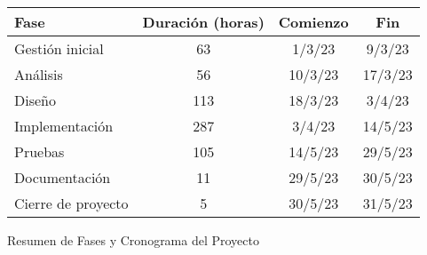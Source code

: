 \begin{planificacion}
	\centering
	\begin{tabular}{ | m{9cm} | c | c | c |}
		\hline
		\textbf{Fase}      & \textbf{Duración (horas)} & \textbf{Comienzo} & \textbf{Fin} \\
		\hline
		Gestión inicial    & 63                        & 1/3/23            & 9/3/23       \\
		\hline
		Análisis           & 56                        & 10/3/23           & 17/3/23      \\
		\hline
		Diseño             & 113                       & 18/3/23           & 3/4/23       \\
		\hline
		Implementación     & 287                       & 3/4/23            & 14/5/23      \\
		\hline
		Pruebas            & 105                       & 14/5/23           & 29/5/23      \\
		\hline
		Documentación      & 11                        & 29/5/23           & 30/5/23      \\
		\hline
		Cierre de proyecto & 5                         & 30/5/23           & 31/5/23      \\
		\hline
	\end{tabular}
	\caption{Resumen de Fases y Cronograma del Proyecto}
\end{planificacion}

